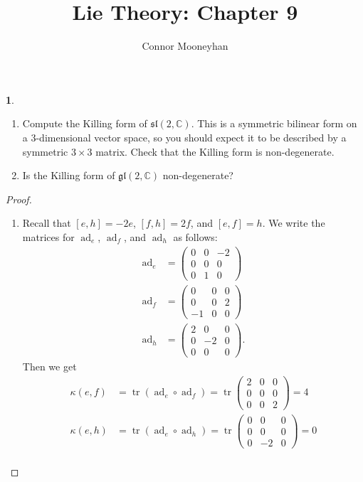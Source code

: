 \documentclass[12pt]{article}
\title{Lie Theory: Chapter 9}
\author{Connor Mooneyhan}
\date{}
\DeclareMathOperator{\ad}{ad}
\DeclareMathOperator{\tr}{tr}
\newcommand{\gl}{\mathfrak{gl}}
\renewcommand{\sl}{\mathfrak{sl}}
\theoremstyle{definition}
\newtheorem{ex}{}
\begin{document}
\maketitle

\begin{ex}\
	\begin{enumerate}[label=(\roman*)]
		\item Compute the Killing form of $\sl(2, \mathbb{C})$.
		This is a symmetric bilinear form on a 3-dimensional vector space, so you should expect it to be described by a symmetric $3 \times 3$ matrix.
		Check that the Killing form is non-degenerate.
		\item Is the Killing form of $\gl(2, \mathbb{C})$ non-degenerate?
	\end{enumerate}
\end{ex}
\begin{proof}\
	\begin{enumerate}[label=(\roman*)]
    \item Recall that $[e, h] = -2e$, $[f, h] = 2f$, and $[e, f] = h$.
      We write the matrices for $\ad_e$, $\ad_f$, and $\ad_h$ as follows: \begin{align*}
        \ad_e & = \begin{pmatrix}0 & 0 & -2 \\ 0 & 0 & 0 \\ 0 & 1 & 0\end{pmatrix} \\
        \ad_f & = \begin{pmatrix}0 & 0 & 0 \\ 0 & 0 & 2 \\ -1 & 0 & 0\end{pmatrix} \\
        \ad_h & = \begin{pmatrix}2 & 0 & 0 \\ 0 & -2 & 0 \\ 0 & 0 & 0\end{pmatrix}.
      \end{align*}
      Then we get \begin{align*}
        \kappa(e, f) & = \tr(\ad_e\circ\ad_f) = \tr\begin{pmatrix}2 & 0 & 0 \\ 0 & 0 & 0 \\ 0 & 0 & 2\end{pmatrix} = 4\\
        \kappa(e, h) & = \tr(\ad_e\circ\ad_h) = \tr\begin{pmatrix}0 & 0 & 0 \\ 0 & 0 & 0 \\ 0 & -2 & 0\end{pmatrix} = 0\\

\end{align*}
\end{enumerate}
\end{proof}
\end{document}
